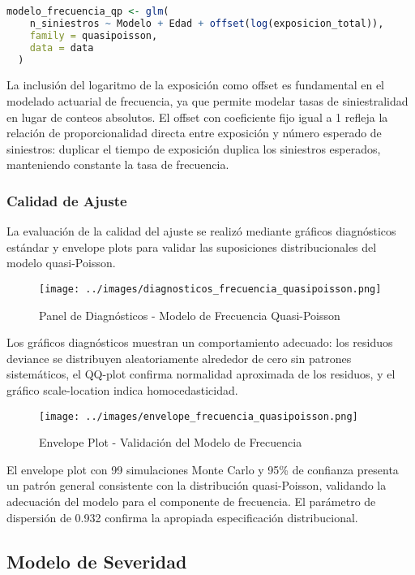 \begin{lstlisting}[language=R]
  modelo_frecuencia_qp <- glm(
    n_siniestros ~ Modelo + Edad + offset(log(exposicion_total)),
    family = quasipoisson,
    data = data
  )
\end{lstlisting}

La inclusión del logaritmo de la exposición como offset es fundamental en el modelado actuarial de frecuencia, ya que permite modelar tasas de siniestralidad en lugar de conteos absolutos. El offset con coeficiente fijo igual a 1 refleja la relación de proporcionalidad directa entre exposición y número esperado de siniestros: duplicar el tiempo de exposición duplica los siniestros esperados, manteniendo constante la tasa de frecuencia.

\subsubsection{Calidad de Ajuste}

La evaluación de la calidad del ajuste se realizó mediante gráficos diagnósticos estándar y envelope plots para validar las suposiciones distribucionales del modelo quasi-Poisson.

\begin{figure}[H]
\centering
\texttt{[image: ../images/diagnosticos\_frecuencia\_quasipoisson.png]}
\caption{Panel de Diagnósticos - Modelo de Frecuencia Quasi-Poisson}
\end{figure}

Los gráficos diagnósticos muestran un comportamiento adecuado: los residuos deviance se distribuyen aleatoriamente alrededor de cero sin patrones sistemáticos, el QQ-plot confirma normalidad aproximada de los residuos, y el gráfico scale-location indica homocedasticidad.

\begin{figure}[H]
\centering
\texttt{[image: ../images/envelope\_frecuencia\_quasipoisson.png]}
\caption{Envelope Plot - Validación del Modelo de Frecuencia}
\end{figure}

El envelope plot con 99 simulaciones Monte Carlo y 95\% de confianza presenta un patrón general consistente con la distribución quasi-Poisson, validando la adecuación del modelo para el componente de frecuencia. El parámetro de dispersión de 0.932 confirma la apropiada especificación distribucional.

\subsection{Modelo de Severidad}

